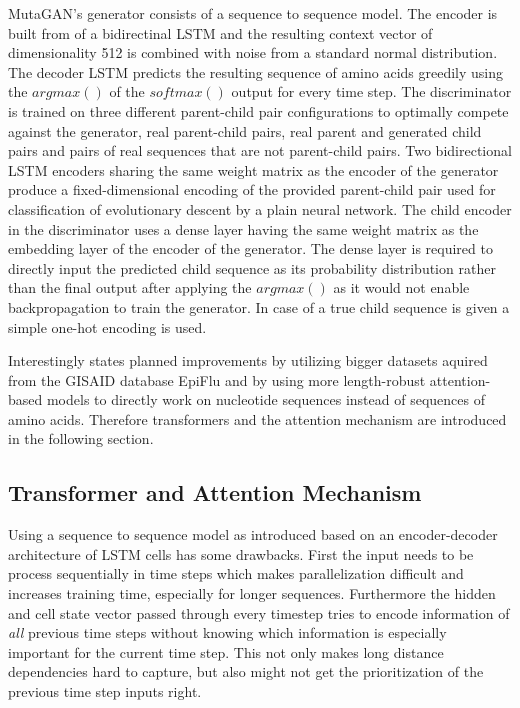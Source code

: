 MutaGAN's generator consists of a sequence to sequence model. The encoder is built from of a bidirectinal \ac{LSTM} and the resulting context vector of dimensionality 512 is combined with noise from a standard normal distribution. The decoder \ac{LSTM} predicts the resulting sequence of amino acids greedily using the $argmax()$ of the $softmax()$ output for every time step. The discriminator is trained on three different parent-child pair configurations to optimally compete against the generator, real parent-child pairs, real parent and generated child pairs and pairs of real sequences that are not parent-child pairs. Two bidirectional \ac{LSTM} encoders sharing the same weight matrix as the encoder of the generator produce a fixed-dimensional encoding of the provided parent-child pair used for classification of evolutionary descent by a plain neural network. The child encoder in the discriminator uses a dense layer having the same weight matrix as the embedding layer of the encoder of the generator. The dense layer is required to directly input the predicted child sequence as its probability distribution rather than the final output after applying the $argmax()$ as it would not enable backpropagation to train the generator. In case of a true child sequence is given a simple one-hot encoding is used. \cite{Berman2020}

Interestingly \cite{Berman2020} states planned improvements by utilizing bigger datasets aquired from the \ac{GISAID} database EpiFlu and by using more length-robust attention-based models to directly work on nucleotide sequences instead of sequences of amino acids. Therefore transformers and the attention mechanism are introduced in the following section.

\subsection{Transformer and Attention Mechanism} \label{fundamentalsG}

Using a sequence to sequence model as introduced based on an encoder-decoder architecture of \ac{LSTM} cells has some drawbacks. First the input needs to be process sequentially in time steps which makes parallelization difficult and increases training time, especially for longer sequences. Furthermore the hidden and cell state vector passed through every timestep tries to encode information of \textit{all} previous time steps without knowing which information is especially important for the current time step. This not only makes long distance dependencies hard to capture, but also might not get the prioritization of the previous time step inputs right.  \cite{Bahdanau2016, Vaswani2017} 

